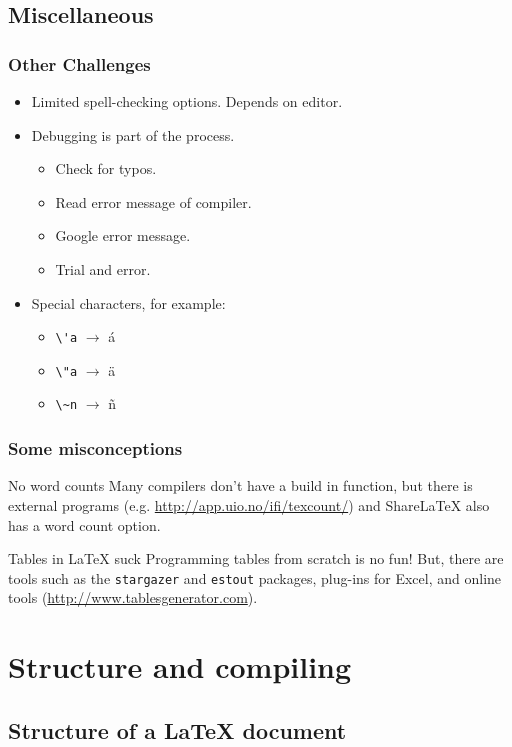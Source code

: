 \documentclass{beamer} %
\begin{document}
\subsection{Miscellaneous}

\begin{frame}[fragile]
\frametitle{Other Challenges}
\begin{itemize}
\item Limited spell-checking options. Depends on editor.
\item Debugging is part of the process.
\begin{itemize}
\item Check for typos.
\item Read error message of compiler.
\item Google error message.
\item Trial and error.
\end{itemize}
\item Special characters, for example:
\begin{itemize}
\item   \verb|\'a|  $\longrightarrow$   \'a 
\item  \verb|\"a|  $\longrightarrow$ \"a
\item \verb|\~n| $\longrightarrow$ \~n
\end{itemize}
\end{itemize}
\end{frame}
 
\begin{frame}
\frametitle{Some misconceptions}
\begin{block}{No word counts}%
Many compilers don't have a build in function, but there is external programs (e.g. \url{http://app.uio.no/ifi/texcount/}) and ShareLaTeX also has a word count option.
\end{block}
\begin{block}{Tables in {\LaTeX} suck}%
Programming tables from scratch is no fun! But, there are tools such as the \texttt{stargazer} and \texttt{estout} packages, plug-ins for Excel, and online tools (\url{http://www.tablesgenerator.com}).
\end{block}
\end{frame} 
 
\section{Structure and compiling}\label{structure}

\subsection{Structure of a {\LaTeX} document}
\end{document}
